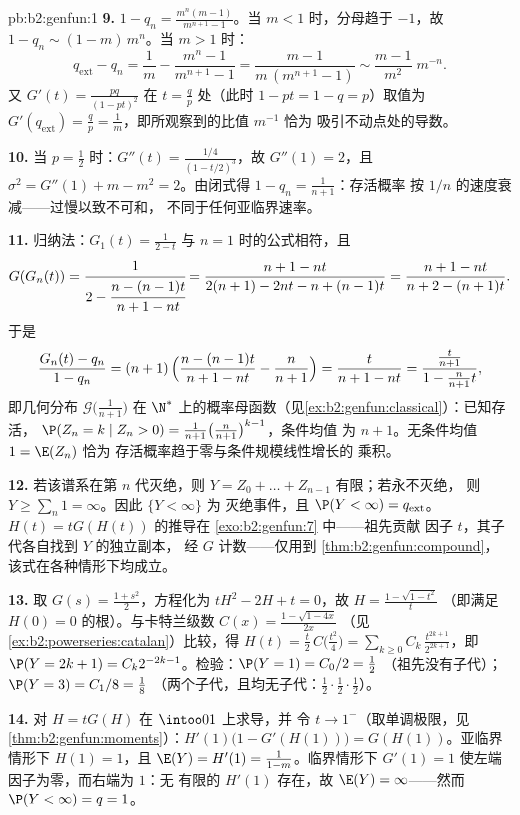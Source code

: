 \begin{solution}{pb:b2:genfun:1}
\textbf{9.} $1 - q_n = \frac{m^n(m - 1)}{m^{n+1} - 1}$。当
$m < 1$ 时，分母趋于 $-1$，故 $1 - q_n \sim (1 -
m)\,m^n$。当 $m > 1$ 时：
\[
q_{\mathrm{ext}} - q_n = \frac1m - \frac{m^n - 1}{m^{n+1} -
1} = \frac{m - 1}{m\,(m^{n+1} - 1)} \sim \frac{m -
1}{m^{2}}\;m^{-n} .
\]
又 $G'(t) = \frac{pq}{(1 - pt)^2}$ 在 $t = \frac
qp$ 处（此时 $1 - pt = 1 - q = p$）取值为 $G'(q_{\mathrm{ext}})
= \frac qp = \frac1m$，即所观察到的比值 $m^{-1}$ 恰为
吸引不动点处的导数。

\textbf{10.} 当 $p = \frac12$ 时：$G''(t) = \frac{1/4}{(1 -
t/2)^3}$，故 $G''(1) = 2$，且 $\sigma^2 = G''(1) + m - m^2 =
2$。由闭式得 $1 - q_n = \frac1{n+1}$：存活概率
按 $1/n$ 的速度衰减——过慢以致不可和，
不同于任何亚临界速率。

\textbf{11.} 归纳法：$G_1(t) = \frac1{2-t}$ 与
$n = 1$ 时的公式相符，且
\[
G(G_n(t)) = \cfrac{1}{2 - \cfrac{n - (n-1)t}{n+1 - nt}}
= \frac{n + 1 - nt}{2(n+1) - 2nt - n + (n-1)t}
= \frac{n+1 - nt}{n + 2 - (n+1)t} .
\]
于是
\[
\frac{G_n(t) - q_n}{1 - q_n}
= (n+1)\,\Bigl(\frac{n - (n-1)t}{n+1 - nt} -
\frac{n}{n+1}\Bigr)
= \frac{t}{n + 1 - nt}
= \frac{\frac{t}{n+1}}{1 - \frac{n}{n+1}t} ,
\]
即几何分布 $\mathcal G\bigl(\frac1{n+1}
\bigr)$ 在 $\N^*$ 上的概率母函数（见\cref{ex:b2:genfun:classical}）：已知存活，
$\P(Z_n = k \mid Z_n > 0) =
\frac1{n+1}\bigl(\frac n{n+1}\bigr)^{k-1}$，条件均值
为 $n + 1$。无条件均值 $1 = \E(Z_n)$ 恰为
存活概率趋于零与条件规模线性增长的
乘积。

\textbf{12.} 若该谱系在第 $n$ 代灭绝，则
$Y = Z_0 + \dots + Z_{n-1}$ 有限；若永不灭绝，
则 $Y \geq \sum_n 1 = \infty$。因此 $\{Y < \infty\}$ 为
灭绝事件，且 $\P(Y < \infty) = q_{\mathrm{ext}}$。
$H(t) = tG(H(t))$ 的推导在
\cref{exo:b2:genfun:7} 中——祖先贡献
因子 $t$，其子代各自找到 $Y$ 的独立副本，
经 $G$ 计数——仅用到
\cref{thm:b2:genfun:compound}，该式在各种情形下均成立。

\textbf{13.} 取 $G(s) = \frac{1 + s^2}2$，方程化为
$tH^2 - 2H + t = 0$，故 $H = \frac{1 - \sqrt{1 - t^2}}{t}$
（即满足 $H(0) = 0$ 的根）。与卡特兰级数
$C(x) = \frac{1 - \sqrt{1 - 4x}}{2x}$
（见\cref{ex:b2:powerseries:catalan}）比较，得 $H(t) = \frac
t2\,C\bigl(\frac{t^2}4\bigr) =
\sum_{k\geq0}C_k\,\frac{t^{2k+1}}{2^{2k+1}}$，即 $\P(Y =
2k+1) = C_k2^{-2k-1}$。检验：$\P(Y = 1) = C_0/2 = \frac12$
（祖先没有子代）；$\P(Y = 3) = C_1/8 = \frac18$
（两个子代，且均无子代：$\frac12\cdot\frac12\cdot
\frac12$）。

\textbf{14.} 对 $H = tG(H)$ 在 $\intoo01$ 上求导，并
令 $t \to 1^-$（取单调极限，见
\cref{thm:b2:genfun:moments}）：$H'(1)\bigl(1 - G'(H(1))\bigr)
= G(H(1))$。亚临界情形下 $H(1) = 1$，且 $\E(Y) =
H'(1) = \frac1{1 - m}$。临界情形下 $G'(1) = 1$
使左端因子为零，而右端为 $1$：无
有限的 $H'(1)$ 存在，故 $\E(Y) = \infty$——然而 $\P(Y <
\infty) = q = 1$。


\end{solution}
